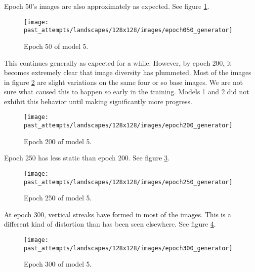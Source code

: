 \documentclass[11pt,letterpaper]{article}
\begin{document}
				Epoch 50's images are also approximately as expected.
				See figure \ref{fig:wa128:epoch050generator}.
				\begin{figure}
					\centering
					\texttt{[image: past\_attempts/landscapes/128x128/images/epoch050\_generator]}
					\caption{Epoch 50 of model 5.}
					\label{fig:wa128:epoch050generator}
				\end{figure}

%

				This continues generally as expected for a while.
				However, by epoch 200, it becomes extremely clear that image diversity has plummeted.
				Most of the images in figure \ref{fig:wa128:epoch200generator} are slight variations on the same four or so base images.
				We are not sure what caused this to happen so early in the training.
				Models 1 and 2 did not exhibit this behavior until making significantly more progress.
				\begin{figure}
					\centering
					\texttt{[image: past\_attempts/landscapes/128x128/images/epoch200\_generator]}
					\caption{Epoch 200 of model 5.}
					\label{fig:wa128:epoch200generator}
				\end{figure}

				Epoch 250 has less static than epoch 200.
				See figure \ref{fig:wa128:epoch250generator}.
				\begin{figure}
					\centering
					\texttt{[image: past\_attempts/landscapes/128x128/images/epoch250\_generator]}
					\caption{Epoch 250 of model 5.}
					\label{fig:wa128:epoch250generator}
				\end{figure}

				At epoch 300, vertical streaks have formed in most of the images.
				This is a different kind of distortion than has been seen elsewhere.
				See figure \ref{fig:wa128:epoch300generator}.
				\begin{figure}
					\centering
					\texttt{[image: past\_attempts/landscapes/128x128/images/epoch300\_generator]}
					\caption{Epoch 300 of model 5.}
					\label{fig:wa128:epoch300generator}
				\end{figure}
\end{document}
